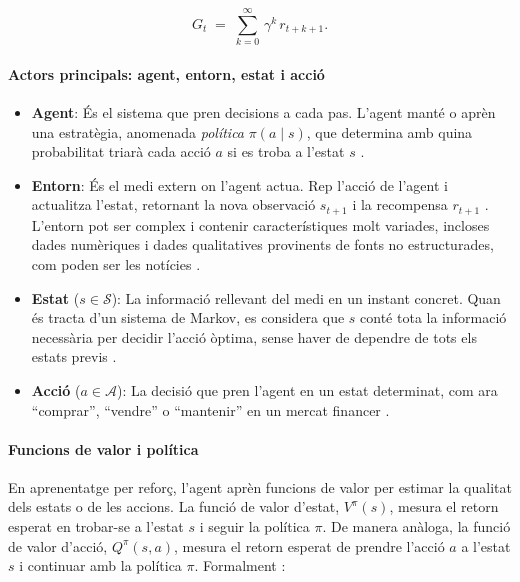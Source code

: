 \documentclass[12pt,a4paper,twoside]{book}
\begin{document}
\begin{equation}
G_t \;=\; \sum_{k=0}^{\infty} \,\gamma^k \, r_{t+k+1}.
\end{equation}

\paragraph{Actors principals: agent, entorn, estat i acció}

\begin{itemize}
\item \textbf{Agent}: És el sistema que pren decisions a cada pas. L'agent manté o aprèn una estratègia, anomenada \emph{política} $\pi(a \mid s)$, que determina amb quina probabilitat triarà cada acció $a$ si es troba a l'estat $s$ \cite{M1}.

\item \textbf{Entorn}: És el medi extern on l'agent actua. Rep l'acció de l'agent i actualitza l'estat, retornant la nova observació $s_{t+1}$ i la recompensa $r_{t+1}$ \cite{M1}. L'entorn pot ser complex i contenir característiques molt variades, incloses dades numèriques i dades qualitatives provinents de fonts no estructurades, com poden ser les notícies .

\item \textbf{Estat} ($s \in \mathcal{S}$): La informació rellevant del medi en un instant concret. Quan és tracta d'un sistema de Markov, es considera que $s$ conté tota la informació necessària per decidir l'acció òptima, sense haver de dependre de tots els estats previs \cite{M1}.

\item \textbf{Acció} ($a \in \mathcal{A}$): La decisió que pren l'agent en un estat determinat, com ara “comprar”, “vendre” o “mantenir” en un mercat financer \cite{M1}.
\end{itemize}

\paragraph{Funcions de valor i política}

En aprenentatge per reforç, l'agent aprèn funcions de valor per estimar la qualitat dels estats o de les accions. La funció de valor d'estat, $V^\pi(s)$, mesura el retorn esperat en trobar-se a l'estat $s$ i seguir la política $\pi$. De manera anàloga, la funció de valor d'acció, $Q^\pi(s,a)$, mesura el retorn esperat de prendre l'acció $a$ a l'estat $s$ i continuar amb la política $\pi$. Formalment \cite{M1}:
\end{document}
